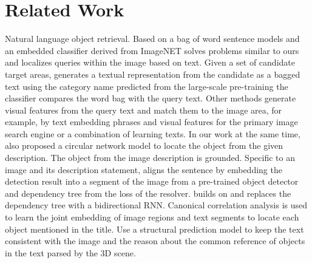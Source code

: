 \documentclass[10pt,twocolumn,letterpaper]{article}
\begin{document}
\section{Related Work}
Natural language object retrieval. Based on a bag of word sentence models and an embedded classifier derived from ImageNET solves problems similar to ours and localizes queries within the image based on text. Given a set of candidate target areas, generates a textual representation from the candidate as a bagged text using the category name predicted from the large-scale pre-training
the classifier compares the word bag with the query text. Other methods generate visual features from the query text and match them to the image area, for example, by text embedding phrases and visual features for the primary image search engine\cite{Arandjelovic_2012_Multiple} or a combination of learning texts. In our work at the same time, \cite{Mao_2016_Generation} also proposed a circular network model to locate the object from the given description. The object from the image description is grounded. Specific to an image and its description statement, \cite{Karpathy_2014_Deep}aligns the sentence by embedding the detection result into a segment of the image from a pre-trained object detector and dependency tree from the loss of the resolver. \cite{Karpathy_2015_Deep}builds on\cite{Karpathy_2014_Deep} and replaces the dependency tree with a bidirectional RNN. Canonical correlation analysis is used to learn the joint embedding of image regions and text segments to locate each object mentioned in the title. Use a structural prediction model to keep the text consistent with the image and the reason about the common reference of objects in the text parsed by the 3D scene.
\end{document}
